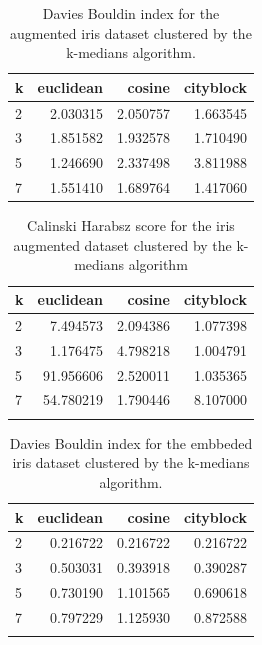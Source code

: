 \documentclass[conference]{IEEEtran}
\begin{document}
    \begin{table}[ht!]
        \centering
        \begin{tabular}{lrrr}
        \toprule
        k &  euclidean &    cosine &  cityblock \\
        \midrule
        2 &   2.030315 &  2.050757 &   1.663545 \\
        3 &   1.851582 &  1.932578 &   1.710490 \\
        5 &   1.246690 &  2.337498 &   3.811988 \\
        7 &   1.551410 &  1.689764 &   1.417060 \\
        \bottomrule
        \end{tabular}
        \caption{Davies Bouldin index for the augmented iris dataset clustered by the k-medians algorithm.}
    \label{tab:i2_db_k}
    \end{table}


\begin{table}[ht!]
    \centering
    \begin{tabular}{lrrr}
    \toprule
    k &  euclidean &    cosine &  cityblock \\
    \midrule
    2 &   7.494573 &  2.094386 &   1.077398 \\
    3 &   1.176475 &  4.798218 &   1.004791 \\
    5 &  91.956606 &  2.520011 &   1.035365 \\
    7 &  54.780219 &  1.790446 &   8.107000 \\
    \bottomrule \\
    \end{tabular}
    \caption{Calinski Harabsz score for the iris augmented dataset clustered by the k-medians algorithm}
    \label{tab:i2_ch_k}
\end{table}

\begin{table}[ht!]
    \centering
    \begin{tabular}{lrrr}
    \toprule
    k &  euclidean &    cosine &  cityblock \\
    \midrule
    2 &   0.216722 &  0.216722 &   0.216722 \\
    3 &   0.503031 &  0.393918 &   0.390287 \\
    5 &   0.730190 &  1.101565 &   0.690618 \\
    7 &   0.797229 &  1.125930 &   0.872588 \\
    \bottomrule \\
    \end{tabular}
    \caption{Davies Bouldin index for the embbeded iris dataset clustered by the k-medians algorithm.}
    \label{tab:ie_db_k}
\end{table}
\end{document}
